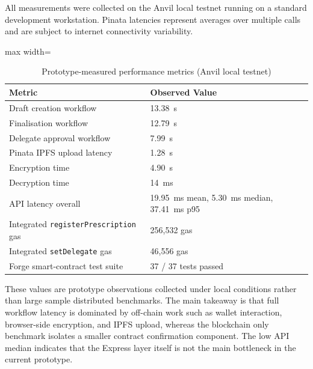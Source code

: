 \documentclass[12pt,a4wide]{report}
\begin{document}
All measurements were collected on the Anvil local testnet running on a standard
development workstation. Pinata latencies represent averages over multiple calls
and are subject to internet connectivity variability.

\begin{table}[H]
\centering
\caption{Prototype-measured performance metrics (Anvil local testnet)}
\label{tab:perf}
\begin{adjustbox}{max width=\textwidth}
\begin{tabular}{@{}ll@{}}
\toprule
\textbf{Metric} & \textbf{Observed Value} \\
\midrule
Draft creation workflow                  & 13.38~s \\
Finalisation workflow                    & 12.79~s \\
Delegate approval workflow               & 7.99~s \\
Pinata IPFS upload latency               & 1.28~s \\
Encryption time                          & 4.90~s \\
Decryption time                          & 14~ms \\
API latency overall                      & 19.95~ms mean, 5.30~ms median, 37.41~ms p95 \\
Integrated \texttt{registerPrescription} gas & 256{,}532 gas \\
Integrated \texttt{setDelegate} gas      & 46{,}556 gas \\
Forge smart-contract test suite          & 37 / 37 tests passed \\
\bottomrule
\end{tabular}
\end{adjustbox}
\end{table}

These values are prototype observations collected under local conditions rather
than large sample distributed benchmarks. The main takeaway is that full workflow
latency is dominated by off-chain work such as wallet interaction, browser-side
encryption, and IPFS upload, whereas the blockchain only benchmark isolates a
smaller contract confirmation component. The low API median indicates that the
Express layer itself is not the main bottleneck in the current prototype.
\end{document}
